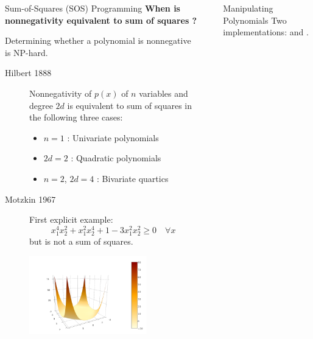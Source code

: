 \documentclass[final]{beamer}
\newlength{\sepwid}
\newlength{\onecolwid}
\begin{document}
\begin{frame}[t,fragile]
\begin{columns}[t]
\begin{column}{\onecolwid}
\begin{block}{Sum-of-Squares (SOS) Programming}
  \textbf{When is nonnegativity equivalent to sum of squares ?}

  Determining whether a polynomial is nonnegative is \alert{NP-hard}.

    \begin{description}
      \item[Hilbert 1888]
        Nonnegativity of $p(x)$ of $n$ variables and degree $2d$ is equivalent to sum of squares in the following three cases:
        \begin{itemize}
          \item $n = 1$ : Univariate polynomials
          \item $2d = 2$ : Quadratic polynomials
          \item $n = 2$, $2d = 4$ : Bivariate quartics
        \end{itemize}

      \item[Motzkin 1967]
        First explicit example:
        \[ x_1^4x_2^2 + x_1^2x_2^4 + 1 - 3x_1^2x_2^2 \geq 0 \quad \forall x \]
        but is \alert{not} a sum of squares.
        \begin{center}
          \includegraphics[trim=3cm .7cm 6cm 3cm, clip, width=0.7\textwidth]{motzkin.png}
        \end{center}
    \end{description}

  \end{block}

\end{column}

\begin{column}{\sepwid}\end{column} %

\begin{column}{\onecolwid} %
  \begin{block}{Manipulating Polynomials}
    Two implementations:
         and
        .


\end{block}
\end{column}
\end{columns}
\end{frame}
\end{document}
